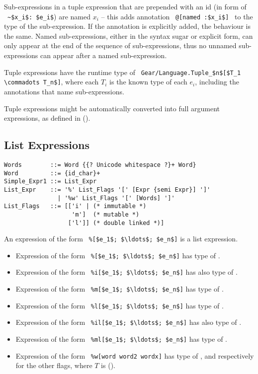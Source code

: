 Sub-expressions in a tuple expression that are prepended with an id (in form of ~\lstinline!~$x_i$: $e_i$!) are named $x_i$ -- this adds annotation ~\lstinline!@[named :$x_i$]!~ to the type of the sub-expression. If the annotation is explicitly added, the behaviour is the same. Named sub-expressions, either in the syntax sugar or explicit form, can only appear at the end of the sequence of sub-expressions, thus no unnamed sub-expressions can appear after a named sub-expression. 

Tuple expressions have the runtime type of ~\lstinline!Gear/Language.Tuple_$n$[$T_1 \commadots T_n$]!, where each $T_i$ is the known type of each $e_i$, including the annotations that name sub-expressions. 

Tuple expressions might be automatically converted into full argument expressions, as defined in ().





\subsection{List Expressions}
\label{sec:list-expressions}

\syntax\begin{lstlisting}
Words        ::= Word {{? Unicode whitespace ?}+ Word}
Word         ::= {id_char}+
Simple_Expr1 ::= List_Expr
List_Expr    ::= '%' List_Flags '[' [Expr {semi Expr}] ']'
               | '%w' List_Flags '[' [Words] ']'
List_Flags   ::= [['i' | (* immutable *)
                   'm']  (* mutable *)
                  ['l']] (* double linked *)]
\end{lstlisting}

An expression of the form ~\lstinline!%[$e_1$; $\ldots$; $e_n$]! is a list expression. 

\begin{itemize}
  \item Expression of the form ~\lstinline!%[$e_1$; $\ldots$; $e_n$]!
    has type of . 
  \item Expression of the form ~\lstinline!%i[$e_1$; $\ldots$; $e_n$]!
    has also type of . 
  \item Expression of the form ~\lstinline!%m[$e_1$; $\ldots$; $e_n$]!
    has type of . 
  \item Expression of the form ~\lstinline!%l[$e_1$; $\ldots$; $e_n$]!
    has type of . 
  \item Expression of the form ~\lstinline!%il[$e_1$; $\ldots$; $e_n$]!
    has also type of . 
  \item Expression of the form ~\lstinline!%ml[$e_1$; $\ldots$; $e_n$]!
    has type of . 
  \item Expression of the form ~\lstinline!%w[word word2 wordx]!
    has type of , and respectively for the other flags, where $T$ is  (). 
\end{itemize}

